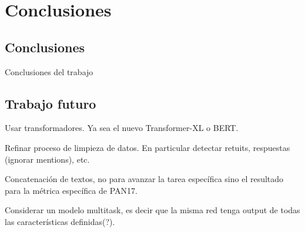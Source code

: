 
\chapter{Conclusiones}

\label{Chapter6} %

\section{Conclusiones}

Conclusiones del trabajo

\section{Trabajo futuro}

Usar transformadores. Ya sea el nuevo Transformer-XL o BERT.

Refinar proceso de limpieza de datos. En particular detectar retuits, respuestas (ignorar mentions), etc.

Concatenación de textos, no para avanzar la tarea específica sino el resultado para la métrica específica de PAN17.

Considerar un modelo multitask, es decir que la misma red tenga output de todas las características definidas(?).
